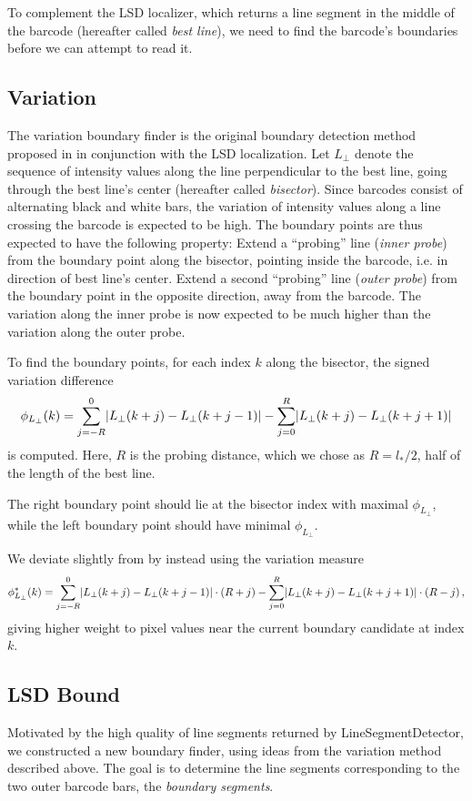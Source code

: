 To complement the LSD localizer, which returns a line segment in the middle of
the barcode (hereafter called \emph{best line}), we need to find the barcode's boundaries before we can attempt to
read it.

\subsection{Variation}
The variation boundary finder is the original boundary detection method proposed
in \cite{Creusot2016} in conjunction with the LSD localization. Let $L_\perp$
denote the sequence of intensity values along the line perpendicular to the best
line, going through the best line's center (hereafter called \emph{bisector}).
Since barcodes consist of alternating black and white bars, the variation of
intensity values along a line crossing the barcode is expected to be high. The
boundary points are thus expected to have the following property: Extend a 
``probing'' line (\emph{inner probe}) from the boundary point along the bisector, pointing inside the
barcode, i.e. in direction of best line's center. Extend a second ``probing''
line (\emph{outer probe}) from the boundary point in the opposite direction, away from the barcode.
The variation along the inner probe is now expected to be much higher than the
variation along the outer probe.

To find the boundary points, for each index $k$ along the bisector, the signed variation
difference
\begin{equation*}
 \phi_{L_\perp} (k)=\sum_{j=-R}^{0}\lvert L_\perp(k+j)-L_\perp(k+j-1)\rvert-\sum_{j=0}^{R}\lvert L_\perp(k+j)-L_\perp(k+j+1)\rvert
\end{equation*}
is computed. Here, $R$ is the probing distance, which we chose as $R=l_*/2$,
half of the length of the best line.

The right boundary point should lie at the
bisector index with maximal $\phi_{L_\perp}$, while the left boundary point
should have minimal $\phi_{L_\perp}$.

We deviate slightly from \citeauthor{Creusot2016} by instead using the variation
measure
\begin{equation*}
 \phi_{L_\perp}^* (k)=\sum_{j=-R}^{0}\lvert L_\perp(k+j)-L_\perp(k+j-1)\rvert\cdot (R+j)-\sum_{j=0}^{R}\lvert L_\perp(k+j)-L_\perp(k+j+1)\rvert\cdot (R-j)\,,
\end{equation*}
giving higher weight to pixel values near the current boundary candidate at
index $k$.

\subsection{LSD Bound}
Motivated by the high quality of line segments returned by LineSegmentDetector,
we constructed a new boundary finder, using ideas from the variation method
described above. The goal is to determine the line segments corresponding to the two
outer barcode bars, the \emph{boundary segments}.

